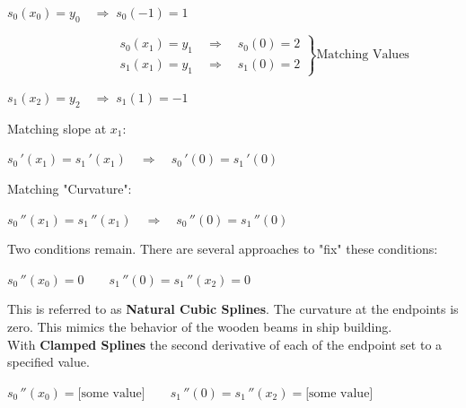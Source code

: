 \documentclass[a4paper,12pt]{report}
\begin{document}
\begin{center} 
 $s_0(x_0)=y_0 \quad \Rightarrow \; s_0(-1)=1 \;\;\,$\\
\end{center}
 \vspace{-3mm}
$
  \left.
    \begin{array}{c}
\qquad \qquad \qquad \qquad \;\; s_0(x_1)=y_1 \quad \Rightarrow \quad s_0(0)=2\\
\qquad \qquad \qquad	\qquad \;\; s_1(x_1)=y_1 \quad \Rightarrow \quad s_1(0)=2
    \end{array}
  \right\}
	\text{Matching Values}
$\\
\begin{center}
\vspace{-5mm}
$s_1(x_2)=y_2 \quad \Rightarrow \; s_1(1)=-1\;\;\,$\\
\end{center}
\medskip
	\noindent Matching slope at $x_1$:\\
\begin{center}
\vspace{-7mm}
	$s_0\,'(x_1)=s_1\,'(x_1) \quad \Rightarrow \quad s_0\,'(0) = s_1\,'(0)$
\end{center}

\medskip
	\noindent Matching "Curvature":\\
\begin{center}
\vspace{-7mm}
	$s_0\,''(x_1)=s_1\,''(x_1) \quad \Rightarrow \quad s_0\,''(0) = s_1\,''(0)$
\end{center}
\medskip

	\noindent Two conditions remain.  There are several approaches to "fix" these conditions:
\begin{center}
	$s_0\,''(x_0)=0\qquad s_1\,''(0) = s_1\,''(x_2)=0$
\end{center}

	\noindent This is referred to as \textbf{Natural Cubic Splines}.  The curvature at the endpoints is zero.
	This mimics the behavior of the wooden beams in ship building.\\


	With \textbf{Clamped Splines} the second derivative of each of the endpoint set to a specified value.
\begin{center}
\vspace{-2mm}
	$s_0\,''(x_0)=\text{[some value]} \qquad s_1\,''(0) = s_1\,''(x_2)=\text{[some value]}$
\end{center}
\end{document}
